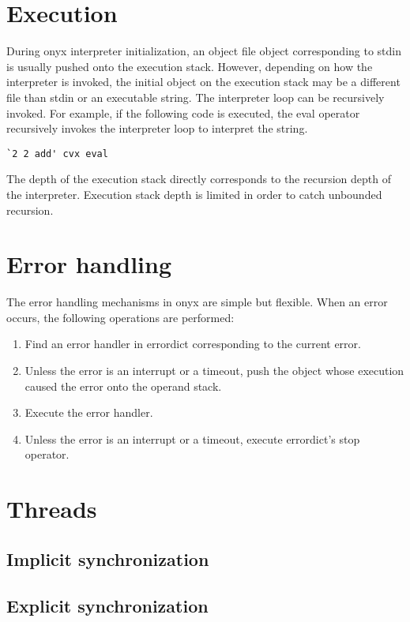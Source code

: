 \section{Execution}

During onyx interpreter initialization, an object file object corresponding to
stdin is usually pushed onto the execution stack.  However, depending on how the
interpreter is invoked, the initial object on the execution stack may be a
different file than stdin or an executable string.  The interpreter loop can be
recursively invoked.  For example, if the following code is executed, the eval
operator recursively invokes the interpreter loop to interpret the string.
\begin{verbatim}
`2 2 add' cvx eval
\end{verbatim}

The depth of the execution stack directly corresponds to the recursion depth of
the interpreter.  Execution stack depth is limited in order to catch unbounded
recursion.

\section{Error handling}

The error handling mechanisms in onyx are simple but flexible.  When an error
occurs, the following operations are performed:
\begin{enumerate}
\item{Find an error handler in errordict corresponding to the current error.}
\item{Unless the error is an interrupt or a timeout, push the object whose
execution caused the error onto the operand stack.}
\item{Execute the error handler.}
\item{Unless the error is an interrupt or a timeout, execute errordict's stop
operator.}
\end{enumerate}

\section{Threads}
\subsection{Implicit synchronization}
\subsection{Explicit synchronization}

